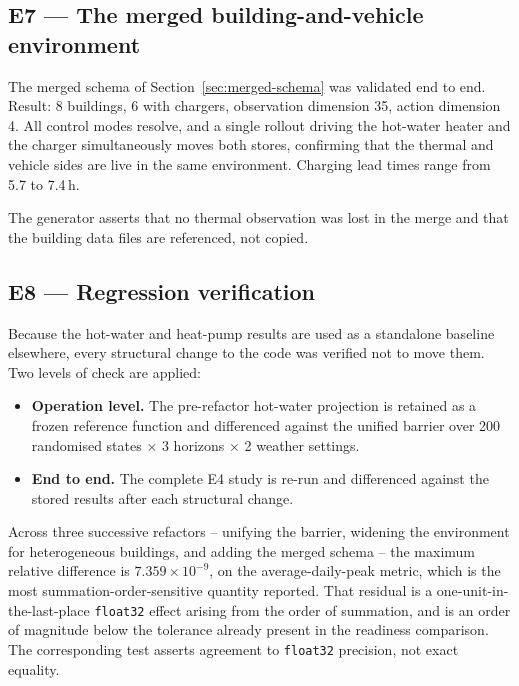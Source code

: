 \documentclass[11pt]{article}
\begin{document}
\subsection{E7 --- The merged building-and-vehicle environment}
\label{sec:exp-merged}

The merged schema of Section~\ref{sec:merged-schema} was validated end to end.
Result: 8 buildings, 6 with chargers, observation dimension 35, action dimension
4. All control modes resolve, and a single rollout driving the hot-water heater
and the charger simultaneously moves both stores, confirming that the thermal and
vehicle sides are live in the same environment. Charging lead times range from
5.7 to 7.4\,h.

The generator asserts that no thermal observation was lost in the merge and that
the building data files are referenced, not copied.

\subsection{E8 --- Regression verification}
\label{sec:exp-regression}

Because the hot-water and heat-pump results are used as a standalone baseline
elsewhere, every structural change to the code was verified not to move them.
Two levels of check are applied:

\begin{itemize}[nosep]
\item \textbf{Operation level.} The pre-refactor hot-water projection is retained
as a frozen reference function and differenced against the unified barrier over
200 randomised states $\times$ 3 horizons $\times$ 2 weather settings.
\item \textbf{End to end.} The complete E4 study is re-run and differenced
against the stored results after each structural change.
\end{itemize}

Across three successive refactors -- unifying the barrier, widening the
environment for heterogeneous buildings, and adding the merged schema -- the
maximum relative difference is $7.359 \times 10^{-9}$, on the average-daily-peak
metric, which is the most summation-order-sensitive quantity reported. That
residual is a one-unit-in-the-last-place \texttt{float32} effect arising from the
order of summation, and is an order of magnitude below the tolerance already
present in the readiness comparison. The corresponding test asserts agreement to
\texttt{float32} precision, not exact equality.
\end{document}
